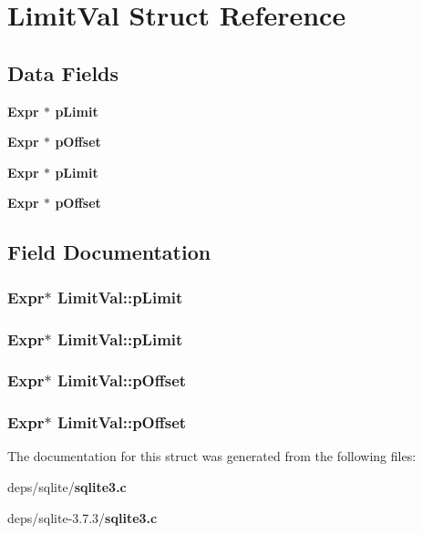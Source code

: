 \section{Limit\-Val Struct Reference}
\label{structLimitVal}
\subsection*{Data Fields}
\begin{CompactItemize}
\item 
\bf{Expr} $\ast$ \bf{p\-Limit}
\item 
\bf{Expr} $\ast$ \bf{p\-Offset}
\item 
\bf{Expr} $\ast$ \bf{p\-Limit}
\item 
\bf{Expr} $\ast$ \bf{p\-Offset}
\end{CompactItemize}


\subsection{Field Documentation}
\subsubsection{\setlength{\rightskip}{0pt plus 5cm}\bf{Expr}$\ast$ \bf{Limit\-Val::p\-Limit}}\label{structLimitVal_6a271a268eb0e42040946111ee4efeca}


\subsubsection{\setlength{\rightskip}{0pt plus 5cm}\bf{Expr}$\ast$ \bf{Limit\-Val::p\-Limit}}\label{structLimitVal_6a271a268eb0e42040946111ee4efeca}


\subsubsection{\setlength{\rightskip}{0pt plus 5cm}\bf{Expr}$\ast$ \bf{Limit\-Val::p\-Offset}}\label{structLimitVal_895ee9030f127757b4ccf510797c95a8}


\subsubsection{\setlength{\rightskip}{0pt plus 5cm}\bf{Expr}$\ast$ \bf{Limit\-Val::p\-Offset}}\label{structLimitVal_895ee9030f127757b4ccf510797c95a8}




The documentation for this struct was generated from the following files:\begin{CompactItemize}
\item 
deps/sqlite/\bf{sqlite3.c}\item 
deps/sqlite-3.7.3/\bf{sqlite3.c}\end{CompactItemize}
